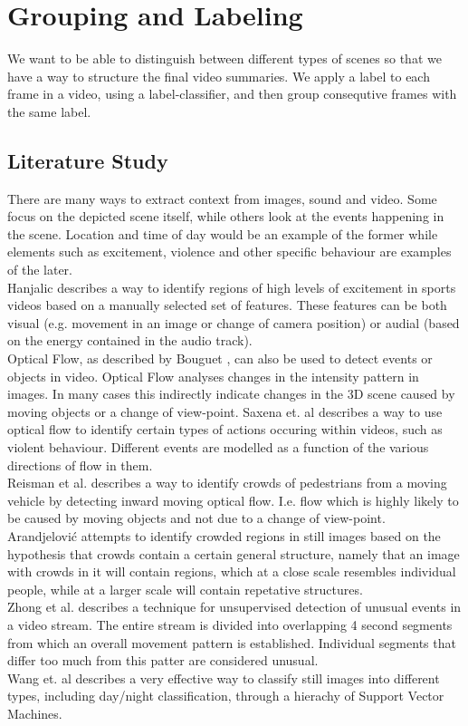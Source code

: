 %
\chapter{Grouping and Labeling}\label{chp:group_and_label}
%
We want to be able to distinguish between different types of scenes so that we have a way to structure the final video summaries. We apply a label to each frame in a video, using a label-classifier, and then group consequtive frames with the same label.
%
\section{Literature Study}
%
There are many ways to extract context from images, sound and video. Some focus on the depicted scene itself, while others look at the events happening in the scene. Location and time of day would be an example of the former while elements such as excitement, violence and other specific behaviour are examples of the later.\\
Hanjalic\cite{citeulike:405480} describes a way to identify regions of high levels of excitement in sports videos based on a manually selected set of features. These features can be both visual (e.g. movement in an image or change of camera position) or audial (based on the energy contained in the audio track).\\
Optical Flow, as described by Bouguet \cite{Bouguet2000}, can also be used to detect events or objects in video. Optical Flow analyses changes in the intensity pattern in images. In many cases this indirectly indicate changes in the 3D scene caused by moving objects or a change of view-point. Saxena et. al\cite{Saxena:2008:CBR:1462298.1462394} describes a way to use optical flow to identify certain types of actions occuring within videos, such as violent behaviour. Different events are modelled as a function of the various directions of flow in them.\\
Reisman et al. \cite{CrowdDetectionInVideoSequences} describes a way to identify crowds of pedestrians from a moving vehicle by detecting inward moving optical flow. I.e. flow which is highly likely to be caused by moving objects and not due to a change of view-point.\\
Arandjelović \cite{Arandjelovic08crowddetection} attempts to identify crowded regions in still images based on the hypothesis that crowds contain a certain general structure, namely that an image with crowds in it will contain regions, which at a close scale resembles individual people, while at a larger scale will contain repetative structures.\\
Zhong et al. \cite{10.1109/CVPR.2004.78} describes a technique for unsupervised detection of unusual events in a video stream. The entire stream is divided into overlapping 4 second segments from which an overall movement pattern is established. Individual segments that differ too much from this patter are considered unusual.\\
Wang et. al\cite{YanniWangandBao-GangHu} describes a very effective way to classify still images into different types, including day/night classification, through a hierachy of Support Vector Machines.
%
